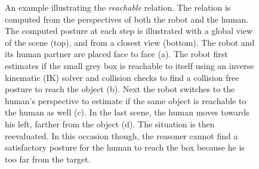 \documentclass[preprint,3p,times]{elsarticle}
\begin{document}
\begin{figure}[!t]
	\centering
    \caption{An example illustrating the \textit{reachable} relation. The
        relation is computed from the perspectives of both the robot and the
        human. The computed posture at each step is illustrated with a global
        view of the scene (top), and from a closest view (bottom). The robot
        and its human partner are placed face to face (a).  The robot first
        estimates if the small grey box is reachable to itself using an inverse
        kinematic (IK) solver and collision checks to find a collision free
        posture to reach the object (b). Next the robot switches to the human's
        perspective to estimate if the same object is reachable to the human as
        well (c).  In the last scene, the human moves towards his left, farther
        from the object (d). The situation is then reevaluated. In this occasion
        though, the reasoner cannot find a satisfactory posture for the human to
    reach the box because he is too far from the target.  }

\label{fig::reach-ex}
\end{figure}
\end{document}
